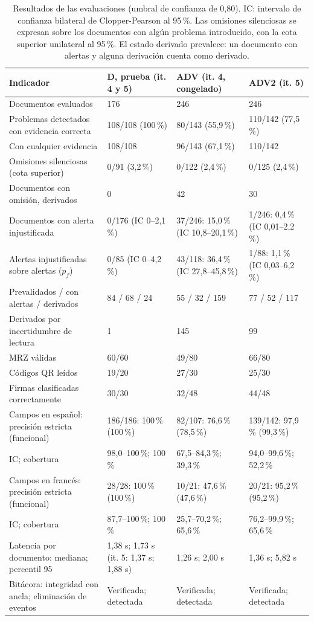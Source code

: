 \documentclass[11pt,a4paper]{article}
\begin{document}
\begin{table}[!htbp]
\centering
\caption{Resultados de las evaluaciones (umbral de confianza de 0,80). IC: intervalo de confianza bilateral de Clopper-Pearson al 95\,\%. Las omisiones silenciosas se expresan sobre los documentos con algún problema introducido, con la cota superior unilateral al 95\,\%. El estado derivado prevalece: un documento con alertas y alguna derivación cuenta como derivado.}
\label{tab:resultados}
\footnotesize
\begin{tabularx}{\textwidth}{>{\raggedright\arraybackslash}p{4.1cm} L L L}
\toprule
\textbf{Indicador} & \textbf{D, prueba (it. 4 y 5)} & \textbf{ADV (it. 4, congelado)} & \textbf{ADV2 (it. 5)} \\
\midrule
Documentos evaluados & 176 & 246 & 246 \\
Problemas detectados con evidencia correcta & 108/108 (100\,\%) & 80/143 (55,9\,\%) & 110/142 (77,5\,\%) \\
\quad Con cualquier evidencia & 108/108 & 96/143 (67,1\,\%) & 110/142 \\
Omisiones silenciosas (cota superior) & 0/91 (3,2\,\%) & 0/122 (2,4\,\%) & 0/125 (2,4\,\%) \\
Documentos con omisión, derivados & 0 & 42 & 30 \\
Documentos con alerta injustificada & 0/176 (IC 0--2,1\,\%) & 37/246: 15,0\,\% (IC 10,8--20,1\,\%) & 1/246: 0,4\,\% (IC 0,01--2,2\,\%) \\
Alertas injustificadas sobre alertas ($p_f$) & 0/85 (IC 0--4,2\,\%) & 43/118: 36,4\,\% (IC 27,8--45,8\,\%) & 1/88: 1,1\,\% (IC 0,03--6,2\,\%) \\
Prevalidados / con alertas / derivados & 84 / 68 / 24 & 55 / 32 / 159 & 77 / 52 / 117 \\
Derivados por incertidumbre de lectura & 1 & 145 & 99 \\
MRZ válidas & 60/60 & 49/80 & 66/80 \\
Códigos QR leídos & 19/20 & 27/30 & 25/30 \\
Firmas clasificadas correctamente & 30/30 & 32/48 & 44/48 \\
Campos en español: precisión estricta (funcional) & 186/186: 100\,\% (100\,\%) & 82/107: 76,6\,\% (78,5\,\%) & 139/142: 97,9\,\% (99,3\,\%) \\
\quad IC; cobertura & 98,0--100\,\%; 100\,\% & 67,5--84,3\,\%; 39,3\,\% & 94,0--99,6\,\%; 52,2\,\% \\
Campos en francés: precisión estricta (funcional) & 28/28: 100\,\% (100\,\%) & 10/21: 47,6\,\% (47,6\,\%) & 20/21: 95,2\,\% (95,2\,\%) \\
\quad IC; cobertura & 87,7--100\,\%; 100\,\% & 25,7--70,2\,\%; 65,6\,\% & 76,2--99,9\,\%; 65,6\,\% \\
Latencia por documento: mediana; percentil 95 & 1,38 s; 1,73 s (it. 5: 1,37 s; 1,88 s) & 1,26 s; 2,00 s & 1,36 s; 5,82 s \\
Bitácora: integridad con ancla; eliminación de eventos & Verificada; detectada & Verificada; detectada & Verificada; detectada \\
\bottomrule
\end{tabularx}
\end{table}
\end{document}
